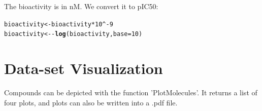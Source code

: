 \documentclass[twoside,a4wide,12pt]{article}\usepackage[]{graphicx}\usepackage[]{color}
\makeatletter
\newcommand{\hlnum}[1]{\textcolor[rgb]{0.686,0.059,0.569}{#1}}%
\newcommand{\hlopt}[1]{\textcolor[rgb]{0,0,0}{#1}}%
\newcommand{\hlstd}[1]{\textcolor[rgb]{0.345,0.345,0.345}{#1}}%
\newcommand{\hlkwb}[1]{\textcolor[rgb]{0.69,0.353,0.396}{#1}}%
\newcommand{\hlkwc}[1]{\textcolor[rgb]{0.333,0.667,0.333}{#1}}%
\newcommand{\hlkwd}[1]{\textcolor[rgb]{0.737,0.353,0.396}{\textbf{#1}}}%
\newenvironment{kframe}{%
 \def\at@end@of@kframe{}%
 \ifinner\ifhmode%
  \def\at@end@of@kframe{\end{minipage}}%
  \begin{minipage}{\columnwidth}%
 \fi\fi%
 \def\FrameCommand##1{\hskip\@totalleftmargin \hskip-\fboxsep
 \colorbox{shadecolor}{##1}\hskip-\fboxsep
     \hskip-\linewidth \hskip-\@totalleftmargin \hskip\columnwidth}%
 \MakeFramed {\advance\hsize-\width
   \@totalleftmargin\z@ \linewidth\hsize
   \@setminipage}}%
 {\par\unskip\endMakeFramed%
 \at@end@of@kframe}
\newenvironment{knitrout}{}{} %
\makeatother
\begin{document}
The bioactivity is in nM. We convert it to pIC50:
\begin{knitrout}
\color{fgcolor}\begin{kframe}
\begin{alltt}
\hlstd{bioactivity} \hlkwb{<-} \hlstd{bioactivity} \hlopt{*} \hlnum{10}\hlopt{^-}\hlnum{9}
\hlstd{bioactivity} \hlkwb{<-} \hlopt{-}\hlkwd{log}\hlstd{(bioactivity,} \hlkwc{base} \hlstd{=} \hlnum{10}\hlstd{)}
\end{alltt}
\end{kframe}
\end{knitrout}


\section{Data-set Visualization}
Compounds can be depicted with the function 'PlotMolecules'. It returns a list of four plots, and plots can also be written into a .pdf file.
\end{document}
